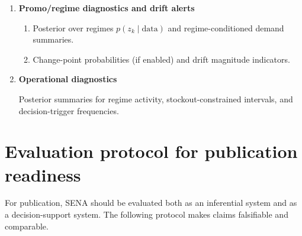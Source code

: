\documentclass[11pt]{article}
\begin{document}
\begin{enumerate}
  If a probability gate is desired before issuing an order recommendation, define
  \begin{equation}\label{eq:reorder-gate}
    \chi^{\mathrm{rec}}_{k,i}
    \equiv
    \mathbf{1}\!\left\{
      p^{\mathrm{need}}_{k,i} > \tau
    \right\},
  \end{equation}
  for a chosen threshold $\tau\in(0,1)$, and set the final recommendation to
  \begin{equation}\label{eq:reorder-quantity-final}
    \hat q^{\mathrm{rec}}_{k,i}
    \equiv
    \chi^{\mathrm{rec}}_{k,i}\,
    q^{\mathrm{rec}}_{k,i}(\eta).
  \end{equation}

  Equivalently, one may define a draw-specific target stock level
  \[
    T^{(s)}_{k,i}\equiv D^{H,(s)}_{k,i},
  \]
  so that Eq.~\eqref{eq:order-gap-draw} becomes
  \[
    g^{(s)}_{k,i} = \bigl(T^{(s)}_{k,i} - IP^{(s)}_{k,i}\bigr)_+.
  \]
  This makes explicit that the Bayesian reorder quantity is a posterior top-up gap, not a fixed batch size.
  A practical default is to display $q^{\mathrm{rec}}_{k,i}(0.5)$, report $[q^{\mathrm{lo}}_{k,i},q^{\mathrm{hi}}_{k,i}]$ as a credible range, and optionally require $p^{\mathrm{need}}_{k,i}>\tau$ before issuing a nonzero recommendation.

  \item \textbf{Promo/regime diagnostics and drift alerts}
  \begin{enumerate}
    \item Posterior over regimes $p(z_k\mid\text{data})$ and regime-conditioned demand summaries.
    \item Change-point probabilities (if enabled) and drift magnitude indicators.
  \end{enumerate}

  \item \textbf{Operational diagnostics}

  Posterior summaries for regime activity, stockout-constrained intervals, and decision-trigger frequencies.
\end{enumerate}

\section{Evaluation protocol for publication readiness}\label{sec:eval-protocol}

For publication, SENA should be evaluated both as an inferential system and as a decision-support system. The following protocol makes claims falsifiable and comparable.
\end{document}
